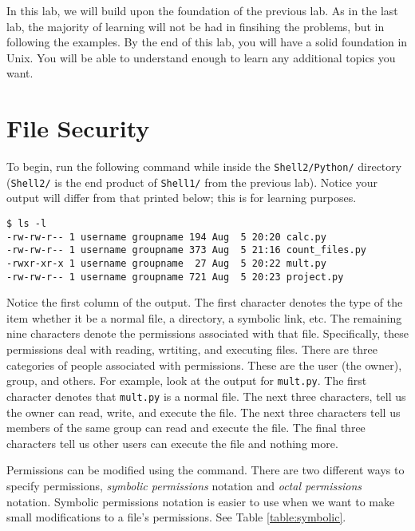 \label{lab:Shell}


In this lab, we will build upon the foundation of the previous lab.
As in the last lab, the majority of learning will not be had in finsihing the problems, but in following the examples.
By the end of this lab, you will have a solid foundation in Unix.
You will be able to understand enough to learn any additional topics you want.

\section*{File Security}
To begin, run the following command while inside the \texttt{Shell2/Python/} directory (\texttt{Shell2/} is the end product of \texttt{Shell1/} from the previous lab).
Notice your output will differ from that printed below; this is for learning purposes.

\begin{lstlisting}
$ ls -l
-rw-rw-r-- 1 username groupname 194 Aug  5 20:20 calc.py
-rw-rw-r-- 1 username groupname 373 Aug  5 21:16 count_files.py
-rwxr-xr-x 1 username groupname  27 Aug  5 20:22 mult.py
-rw-rw-r-- 1 username groupname 721 Aug  5 20:23 project.py
\end{lstlisting}

Notice the first column of the output.
The first character denotes the type of the item whether it be a normal file, a directory, a symbolic link, etc.
The remaining nine characters denote the permissions associated with that file.
Specifically, these permissions deal with reading, wrtiting, and executing files.
There are three categories of people associated with permissions.
These are the user (the owner), group, and others.
For example, look at the output for \texttt{mult.py}.
The first character \li{-} denotes that \texttt{mult.py} is a normal file.
The next three characters,  tell us the owner can read, write, and execute the file.
The next three characters  tell us members of the same group can read and execute the file.
The final three characters  tell us other users can execute the file and nothing more.

Permissions can be modified using the  command.
There are two different ways to specify permissions, \emph{symbolic permissions} notation and \emph{octal permissions} notation.
Symbolic permissions notation is easier to use when we want to make small modifications to a file's permissions.
See Table \ref{table:symbolic}.

